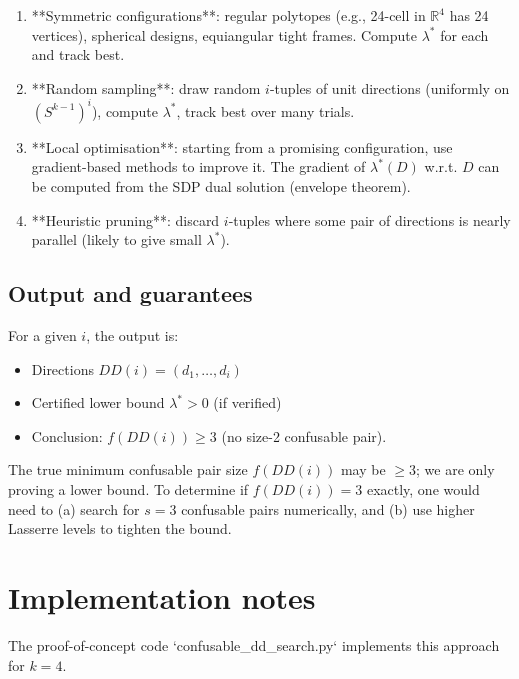 \documentclass[12pt,a4paper]{article}
\begin{document}
\begin{enumerate}
  \item **Symmetric configurations**: regular polytopes (e.g., 24-cell in $\mathbb{R}^4$
    has 24 vertices), spherical designs, equiangular tight frames.  Compute $\lambda^*$ for
    each and track best.

  \item **Random sampling**: draw random $i$-tuples of unit directions (uniformly on
    $(S^{k-1})^i$), compute $\lambda^*$, track best over many trials.

  \item **Local optimisation**: starting from a promising configuration, use gradient-based
    methods to improve it.  The gradient of $\lambda^*(D)$ w.r.t. $D$ can be computed from
    the SDP dual solution (envelope theorem).

  \item **Heuristic pruning**: discard $i$-tuples where some pair of directions is nearly
    parallel (likely to give small $\lambda^*$).
\end{enumerate}

\subsection*{Output and guarantees}

For a given $i$, the output is:
\begin{itemize}
  \item Directions $DD(i) = (d_1, \ldots, d_i)$
  \item Certified lower bound $\lambda^* > 0$ (if verified)
  \item Conclusion: $f(DD(i)) \geq 3$ (no size-2 confusable pair).
\end{itemize}

The true minimum confusable pair size $f(DD(i))$ may be $\geq 3$; we are only proving
a lower bound.  To determine if $f(DD(i)) = 3$ exactly, one would need to (a) search for
$s=3$ confusable pairs numerically, and (b) use higher Lasserre levels to tighten the bound.

\section{Implementation notes}
\label{sec:implementation}

The proof-of-concept code `confusable_dd_search.py` implements this approach for $k=4$.
\end{document}
